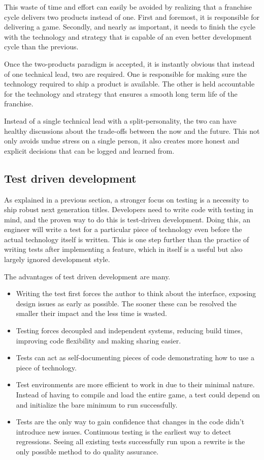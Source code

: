 \documentclass[twocolumn]{paper}
\begin{document}
This waste of time and effort can easily be avoided by realizing
that a franchise cycle delivers two products instead of one. First
and foremost, it is responsible for delivering a game. Secondly, and
nearly as important, it needs to finish the cycle with the
technology and strategy that is capable of an even better
development cycle than the previous.

Once the two-products paradigm is accepted, it is instantly obvious
that instead of one technical lead, two are required. One is
responsible for making sure the technology required to ship a
product is available. The other is held accountable for the
technology and strategy that ensures a smooth long term life of the
franchise.

Instead of a single technical lead with a split-personality, the two
can have healthy discussions about the trade-offs between the now
and the future. This not only avoids undue stress on a single
person, it also creates more honest and explicit decisions that can
be logged and learned from.

\subsection{Test driven development}

As explained in a previous section, a stronger focus on testing is a
necessity to ship robust next generation titles. Developers need to
write code with testing in mind, and the proven way to do this is
test-driven development. Doing this, an engineer will write a test
for a particular piece of technology even before the actual
technology itself is written. This is one step further than the
practice of writing tests after implementing a feature, which in
itself is a useful but also largely ignored development style.

The advantages of test driven development are many.

\begin{itemize}
    \item Writing the test first forces the author to think about the
    interface, exposing design issues as early as possible. The
    sooner these can be resolved the smaller their impact and the
    less time is wasted.
    \item Testing forces decoupled and independent systems, reducing build
    times, improving code flexibility and making sharing easier.
    \item Tests can act as self-documenting pieces of code
    demonstrating how to use a piece of technology.
    \item Test environments are more efficient to work in due to
    their minimal nature. Instead of having to compile and load the entire game,
    a test could depend on and initialize the bare minimum to run
    successfully.
    \item Tests are the only way to gain confidence that changes in
    the code didn't introduce new issues. Continuous testing is the earliest way to detect
    regressions. Seeing all existing tests successfully run upon a
    rewrite is the only possible method to do quality assurance.
\end{itemize}
\end{document}

